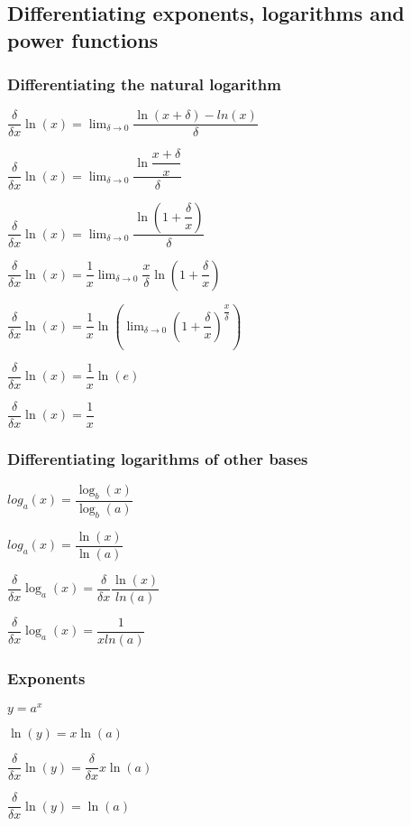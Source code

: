 
\subsection{Differentiating exponents, logarithms and power functions}

\subsubsection{Differentiating the natural logarithm}

\(\dfrac{\delta }{\delta x}\ln (x)=\lim_{\delta \rightarrow 0}\dfrac{\ln(x+\delta)-ln(x)}{\delta }\)

\(\dfrac{\delta }{\delta x}\ln (x)=\lim_{\delta \rightarrow 0}\dfrac{\ln\dfrac{x+\delta}{x}}{\delta }\)

\(\dfrac{\delta }{\delta x}\ln (x)=\lim_{\delta \rightarrow 0}\dfrac{\ln(1+\dfrac{\delta}{x})}{\delta }\)

\(\dfrac{\delta }{\delta x}\ln (x)=\dfrac{1}{x}\lim_{\delta \rightarrow 0}\dfrac{x}{\delta}\ln(1+\dfrac{\delta}{x})\)

\(\dfrac{\delta }{\delta x}\ln (x)=\dfrac{1}{x}\ln(\lim_{\delta \rightarrow 0}(1+\dfrac{\delta}{x})^{\dfrac{x}{\delta }})\)

\(\dfrac{\delta }{\delta x}\ln (x)=\dfrac{1}{x}\ln(e)\)

\(\dfrac{\delta }{\delta x}\ln (x)=\dfrac{1}{x}\)

\subsubsection{Differentiating logarithms of other bases}

\(log_a(x)=\dfrac{\log_b(x)}{\log_b(a)}\)

\(log_a(x)=\dfrac{\ln(x)}{\ln(a)}\)

\(\dfrac{\delta }{\delta x}\log_a(x)=\dfrac{\delta }{\delta x}\dfrac{\ln(x)}{ln(a)}\)

\(\dfrac{\delta }{\delta x}\log_a(x)=\dfrac{1}{xln(a)}\)

\subsubsection{Exponents}

\(y=a^x\)

\(\ln(y)=x\ln(a)\)

\(\dfrac{\delta }{\delta x}\ln(y)=\dfrac{\delta }{\delta x}x\ln(a)\)

\(\dfrac{\delta }{\delta x}\ln(y)=\ln(a)\)

